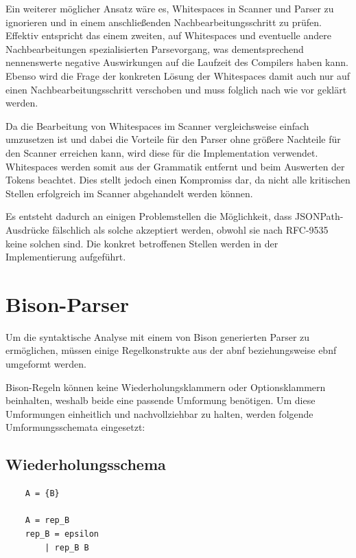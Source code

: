 \documentclass[oneside]{ausarbeitung}
\begin{document}
Ein weiterer möglicher Ansatz wäre es, Whitespaces in Scanner und Parser zu ignorieren und in einem anschließenden Nachbearbeitungsschritt zu prüfen. Effektiv entspricht das einem zweiten, auf Whitespaces und eventuelle andere Nachbearbeitungen spezialisierten Parsevorgang, was dementsprechend nennenswerte negative Auswirkungen auf die Laufzeit des Compilers haben kann. Ebenso wird die Frage der konkreten Lösung der Whitespaces damit auch nur auf einen Nachbearbeitungsschritt verschoben und muss folglich nach wie vor geklärt werden.

\pagebreak

Da die Bearbeitung von Whitespaces im Scanner vergleichsweise einfach umzusetzen ist und dabei die Vorteile für den Parser ohne größere Nachteile für den Scanner erreichen kann, wird diese für die Implementation verwendet. Whitespaces werden somit aus der Grammatik entfernt und beim Auswerten der Tokens beachtet. Dies stellt jedoch einen Kompromiss dar, da nicht alle kritischen Stellen erfolgreich im Scanner abgehandelt werden können.

Es entsteht dadurch an einigen Problemstellen die Möglichkeit, dass JSONPath-Ausdrücke fälschlich als solche akzeptiert werden, obwohl sie nach RFC-9535 keine solchen sind. Die konkret betroffenen Stellen werden in der Implementierung aufgeführt.



	
\section{Bison-Parser}

Um die syntaktische Analyse mit einem von Bison generierten Parser zu ermöglichen, müssen einige Regelkonstrukte aus der \ac{abnf} beziehungsweise \ac{ebnf} umgeformt werden.

Bison-Regeln können keine Wiederholungsklammern oder Optionsklammern beinhalten, weshalb beide eine passende Umformung benötigen. Um diese Umformungen einheitlich und nachvollziehbar zu halten, werden folgende Umformungsschemata eingesetzt:

\subsection{Wiederholungsschema}

\begin{lstlisting}
	A = {B}
	
	A = rep_B
	rep_B = epsilon
		| rep_B B
\end{lstlisting}
\end{document}
